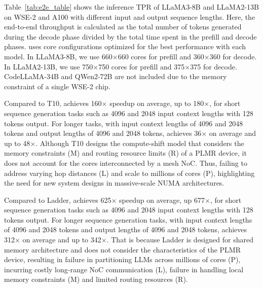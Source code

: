  Table~\ref{tab:e2e_table} shows the inference TPR of LLaMA3-8B and LLaMA2-13B on WSE-2 and A100 with different input and output sequence lengths. Here, the end-to-end throughput is calculated as the total number of tokens generated during the decode phase divided by the total time spent in the prefill and decode phases. \sys uses core configurations optimized for the best performance with each model.
In LLaMA3-8B, we use 660$\times$660 cores for prefill and 360$\times$360 for decode.
In LLaMA2-13B, we use 750$\times$750 cores for prefill and 375$\times$375 for decode.
CodeLLaMA-34B and QWen2-72B are not included due to the memory constraint of a single WSE-2 chip.

Compared to T10, \sys achieves 160$\times$ speedup on average, up to 180$\times$, for short sequence generation tasks such as 4096 and 2048 input context lengths with 128 tokens output. For longer tasks, with input context lengths of 4096 and 2048 tokens and output lengths of 4096 and 2048 tokens, \sys achieves 36$\times$ on average and up to 48$\times$. Although T10 designs the compute-shift model that considers the memory constraints (M) and routing resource limits (R) of a PLMR device, it does not account for the cores interconnected by a mesh NoC. Thus, failing to address varying hop distances (L) and scale to millions of cores (P), highlighting the need for new system designs in massive-scale NUMA architectures.

Compared to Ladder, \sys achieves 625$\times$ speedup on average, up 677$\times$, for short sequence generation tasks such as 4096 and 2048 input context lengths with 128 tokens output. For longer sequence generation tasks, with input context lengths of 4096 and 2048 tokens and output lengths of 4096 and 2048 tokens, \sys achieves 312$\times$ on average and up to 342$\times$. That is because Ladder is designed for shared memory architecture and does not consider the characteristics of the PLMR device, resulting in failure in partitioning LLMs across millions of cores (P), incurring costly long-range NoC communication (L), failure in handling local memory constraints (M) and limited routing resources (R).

